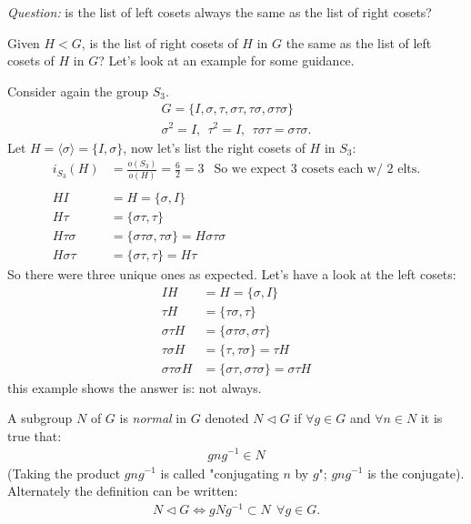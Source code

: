 \noindent \textit{Question:} is the list of left cosets always the same as the list of right cosets?
\steezybreak

\noindent Given $H<G$, is the list of right cosets of $H$ in $G$ the same as the list of left cosets
of $H$ in $G$? Let's look at an example for some guidance.
\begin{example}
Consider again the group $S_3$.
\begin{align}
    G=\{I,\sigma,\tau,\sigma\tau,\tau\sigma,
    \sigma\tau\sigma \} \nonumber \\
    \sigma^2=I, \ \ \tau^2=I, \ \ \tau \sigma \tau = \sigma \tau \sigma. \nonumber
\end{align}
Let $H=\langle \sigma \rangle = \{I,\sigma \}$, now let's list the right cosets of $H$ in $S_3$:
\begin{align}
    i_{S_3}(H)&= \frac{o(S_3)}{o(H)}= \frac{6}{2}=3 \ \ \text{ So we expect 3 cosets each w/ 2 elts.} \nonumber \\ \nonumber \\
    HI &= H = \{\sigma, I\} \nonumber \\
    H\tau  &= \{\sigma\tau, \tau\} \nonumber \\
    H\tau\sigma  &= \{\sigma\tau\sigma, \tau\sigma\}=H\sigma\tau\sigma \nonumber \\
    H\sigma\tau  &= \{\sigma\tau, \tau\} = H\tau \nonumber
\end{align}
So there were three unique ones as expected. Let's have a look at the left cosets:
\begin{align}
    IH  &= H= \{\sigma, I\}  \nonumber \\
    \tau H  &= \{\tau\sigma, \tau \}  \nonumber \\
    \sigma\tau H  &= \{\sigma\tau\sigma, \sigma\tau \}  \nonumber \\
    \tau\sigma H  &= \{\tau, \tau\sigma \} =\tau H \nonumber \\
    \sigma\tau\sigma H  &= \{\sigma\tau, \sigma\tau\sigma \} =\sigma\tau H \nonumber
\end{align}
this example shows the answer is: not always.
\end{example}
\begin{definition}
A subgroup $N$ of $G$ is \textit{normal} in $G$ denoted $N \triangleleft G$ if $\forall g \in G$ and
$\forall n \in N$ it is true that:
\begin{align}
gng^{-1}\in N \nonumber
\end{align}
(Taking the product $gng^{-1}$ is called "conjugating $n$ by $g$"; $gng^{-1}$ is the conjugate).\\
Alternately the definition can be written:
\begin{align}
    N \triangleleft G \iff gNg^{-1}\subset N \ \ \forall g \in G. \nonumber
\end{align}
\end{definition}


